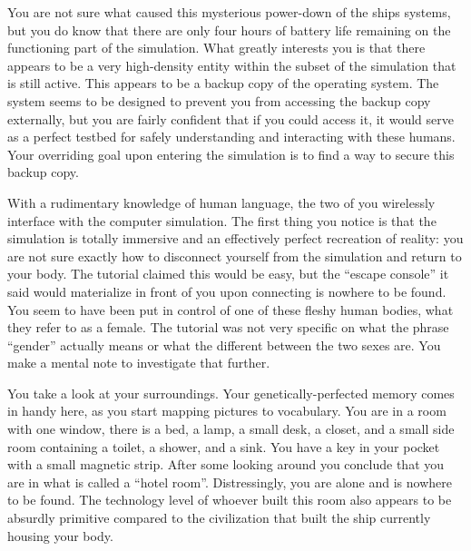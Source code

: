 \documentclass[char]{guildcamp1}
\begin{document}
You are not sure what caused this mysterious power-down of the ships systems, but you do know that there are only four hours of battery life remaining on the functioning part of the simulation. What greatly interests you is that there appears to be a very high-density entity within the subset of the simulation that is still active. This appears to be a backup copy of the operating system. The system seems to be designed to prevent you from accessing the backup copy externally, but you are fairly confident that if you could access it, it would serve as a perfect testbed for safely understanding and interacting with these humans. Your overriding goal upon entering the simulation is to find a way to secure this backup copy.

With a rudimentary knowledge of human language, the two of you wirelessly interface with the computer simulation. The first thing you notice is that the simulation is totally immersive and an effectively perfect recreation of reality: you are not sure exactly how to disconnect yourself from the simulation and return to your body. The tutorial claimed this would be easy, but the ``escape console'' it said would materialize in front of you upon connecting is nowhere to be found. You seem to have been put in control of one of these fleshy human bodies, what they refer to as a female. The tutorial was not very specific on what the phrase ``gender'' actually means or what the different between the two sexes are. You make a mental note to investigate that further.

You take a look at your surroundings. Your genetically-perfected memory comes in handy here, as you start mapping pictures to vocabulary. You are in a room with one window, there is a bed, a lamp, a small desk, a closet, and a small side room containing a toilet, a shower, and a sink. You have a key in your pocket with a small magnetic strip. After some looking around you conclude that you are in what is called a ``hotel room''. Distressingly, you are alone and \cActive{} is nowhere to be found. The technology level of whoever built this room also appears to be absurdly primitive compared to the civilization that built the ship currently housing your body.
\end{document}
